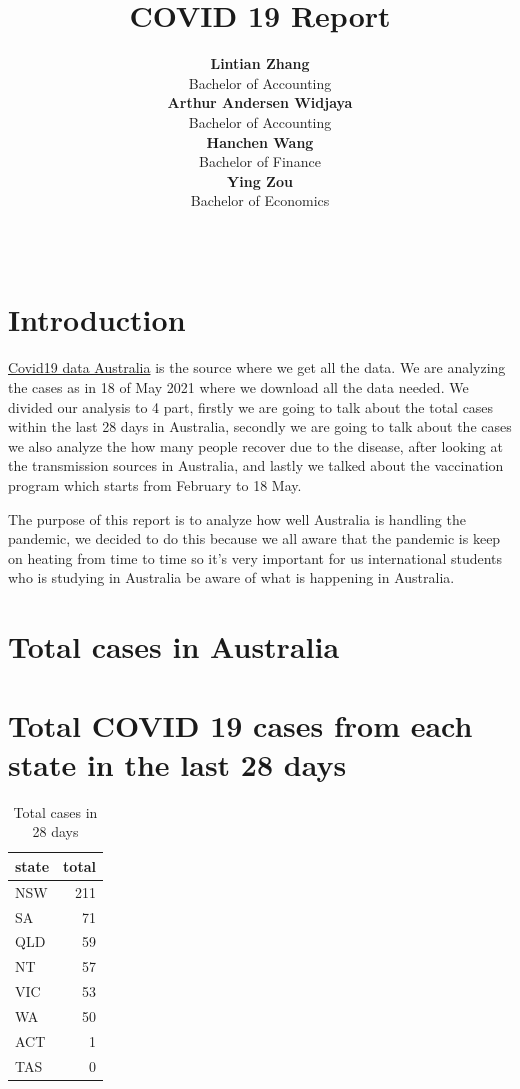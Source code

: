 \documentclass[11pt,a4paper,]{article}
\title{COVID 19 Report}
\author{\sf\Large\textbf{ Lintian Zhang}\\ {\sf\large Bachelor of Accounting\\[0.5cm]} \sf\Large\textbf{ Arthur Andersen Widjaya}\\ {\sf\large Bachelor of Accounting\\[0.5cm]} \sf\Large\textbf{ Hanchen Wang}\\ {\sf\large Bachelor of Finance\\[0.5cm]} \sf\Large\textbf{ Ying Zou}\\ {\sf\large Bachelor of Economics\\[0.5cm]}}
\date{\sf\Date~\Month~\Year}
\makeatletter
\def\titlepage{\front{\expandafter{\@title}}{\@author}{\@organization}}
\makeatother
\begin{document}
\titlepage

\hypertarget{introduction}{%
\section{Introduction}\label{introduction}}

\href{https://www.covid19data.com.au}{Covid19 data Australia} is the source where we get all the data. We are analyzing the cases as in 18 of May 2021 where we download all the data needed. We divided our analysis to 4 part, firstly we are going to talk about the total cases within the last 28 days in Australia, secondly we are going to talk about the cases we also analyze the how many people recover due to the disease, after looking at the transmission sources in Australia, and lastly we talked about the vaccination program which starts from February to 18 May.

The purpose of this report is to analyze how well Australia is handling the pandemic, we decided to do this because we all aware that the pandemic is keep on heating from time to time so it's very important for us international students who is studying in Australia be aware of what is happening in Australia.

\section*{Total cases in Australia}

\hypertarget{total-covid-19-cases-from-each-state-in-the-last-28-days}{%
\section{Total COVID 19 cases from each state in the last 28 days}\label{total-covid-19-cases-from-each-state-in-the-last-28-days}}

\begin{table}

\caption{\label{tab:table1}Total cases in 28 days}
\centering
\begin{tabular}[t]{l|r}
\hline
state & total\\
\hline
NSW & 211\\
\hline
SA & 71\\
\hline
QLD & 59\\
\hline
NT & 57\\
\hline
VIC & 53\\
\hline
WA & 50\\
\hline
ACT & 1\\
\hline
TAS & 0\\
\hline
\end{tabular}
\end{table}
\end{document}
